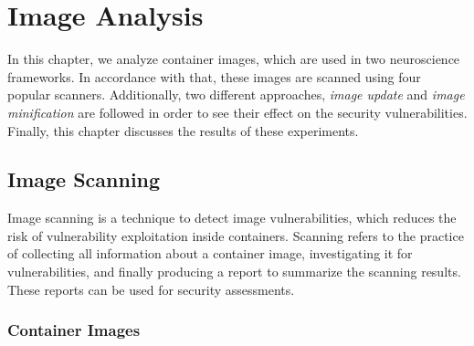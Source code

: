 \chapter{Image Analysis}\label{chapter3}

In this chapter, we analyze container images, which are used in
two neuroscience frameworks. In accordance with that, these
images are scanned using four popular scanners. Additionally,
two different approaches, \textit{image update} and \textit{
image minification} are followed in order to see their
effect on the security vulnerabilities. Finally, this
chapter discusses the results of
these experiments.

\section{Image Scanning}
Image scanning is a technique to
detect image vulnerabilities, which reduces the risk of vulnerability exploitation
inside containers. Scanning refers to the practice of collecting all
information about a container image,
investigating it for
vulnerabilities, and finally producing a report to
summarize the scanning results. These reports can be used for security assessments.

\subsection{Container Images}

